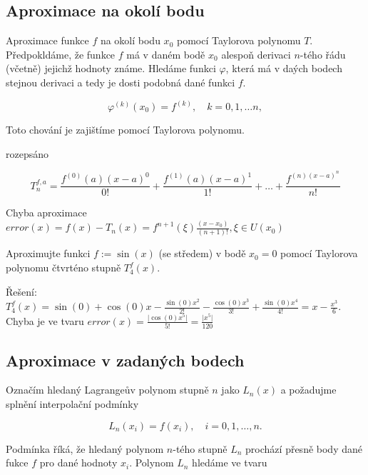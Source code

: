 \subsection{Aproximace na okolí bodu}

Aproximace funkce $f$ na okolí bodu $x_0$ pomocí Taylorova polynomu $T$. Předpokldáme, že funkce $f$ má v daném bodě $x_0$ alespoň derivaci $n$-tého řádu (včetně) jejichž hodnoty známe. Hledáme funkci $\varphi$, která má v daých bodech stejnou derivaci a tedy je dosti podobná dané funkci $f$.

\begin{equation}
    \varphi^{(k)}(x_0) = f^{(k)},  \quad k = 0, 1,\ldots n,
\end{equation}

Toto chování je zajištíme pomocí Taylorova polynomu. 



rozepsáno 

\begin{equation}
T_n^{f,a} = \frac{f^{(0)}(a) (x - a)^0}{0!} + \frac{f^{(1)}(a) (x - a)^1}{1!} + \ldots + \frac{f^{(n) (x - a)^n}}{n!}
\end{equation}

Chyba aproximace $error(x) = f(x) - T_n(x) = f^{n+1}(\xi) \frac{(x - x_0)}{(n + 1)!}, \xi \in U(x_0) $

\begin{example}
Aproximujte funkci $f := \sin(x)$ (se středem) v bodě $x_0 = 0$ pomocí Taylorova polynomu čtvrténo stupně $T_4^f(x)$. 

Řešení:  $T_4^f(x) = \sin(0)  + \cos(0)x - \frac{\sin(0) x^2}{2!} - \frac{\cos(0) x^3}{3!} + \frac{\sin(0) x^4}{4!} = x - \frac{x^3}{6}$. Chyba je ve tvaru $error(x) = \frac{\lvert\cos(0) x^5\rvert}{5!} = \frac{\lvert{x^5}\rvert}{120}$
\end{example}

\subsection{
Aproximace v zadaných bodech
}

Označím hledaný Lagrangeův polynom stupně $n$ jako $L_n(x)$ a požadujme splnění interpolační podmínky 

\begin{equation}
    L_n(x_i) = f(x_i), \quad i = 0, 1,\ldots, n.
\end{equation}

Podmínka říká, že hledaný polynom $n$-tého stupně $L_n$ prochází přesně body dané fukce $f$ pro dané hodnoty $x_i$. Polynom $L_n$ hledáme ve tvaru 


